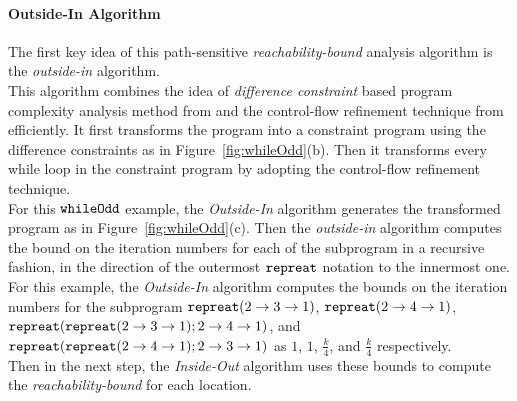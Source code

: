 \paragraph{Outside-In Algorithm}
The first key idea of this path-sensitive \emph{reachability-bound} analysis algorithm is the \emph{outside-in} algorithm.
\\
This algorithm combines the idea of \emph{difference constraint} based program complexity analysis method from \cite{sinn2017complexity}
and the control-flow refinement technique from~\cite{GulwaniJK09} efficiently.
It first
transforms the program into a constraint program using the difference constraints as in Figure~\ref{fig:whileOdd}(b).
Then it transforms every while loop in the constraint program by adopting the control-flow refinement technique.
% 
\\
For this ${\mathtt{whileOdd}}$ example, the \emph{Outside-In} algorithm generates 
the transformed program as in Figure~\ref{fig:whileOdd}(c).
Then
the \emph{outside-in} algorithm
computes the bound on the iteration numbers
for each of the subprogram in a recursive fashion,
in the direction
of the outermost ${\mathtt{repreat}}$ notation to the innermost one.
For this example, the \emph{Outside-In} algorithm computes the bounds
on the iteration numbers for the subprogram
${\mathtt{repreat}}(2 \to 3 \to 1)$, 
${\mathtt{repreat}}(2 \to 4 \to 1)$, 
${\mathtt{repreat}}({\mathtt{repreat}}(2 \to 3 \to 1); 2 \to 4 \to 1)$, and 
${\mathtt{repreat}}({\mathtt{repreat}}(2 \to 4 \to 1); 2 \to 3 \to 1)$
as $1$, $1$, $\frac{k}{4}$, and $\frac{k}{4}$ respectively.
\\
Then in the next step, the \emph{Inside-Out} algorithm uses these bounds 
to compute the \emph{reachability-bound} for each location.
